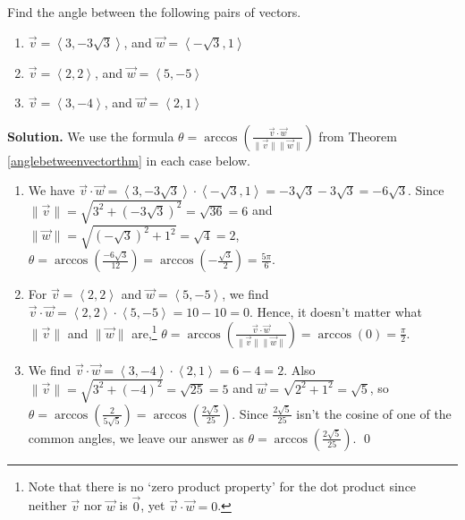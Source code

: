 \smallskip

\begin{ex} \label{anglebetweenvectorex}  Find the angle between the following pairs of vectors.

\begin{enumerate}

\item  $\vec{v} = \left< 3, -3\sqrt{3} \right>$, and $\vec{w} = \left<-\sqrt{3}, 1 \right>$

\item  $\vec{v} = \left< 2, 2 \right>$, and $\vec{w} = \left<5, -5\right>$

\item  $\vec{v} = \left< 3, -4 \right>$, and $\vec{w} = \left<2, 1\right>$

\end{enumerate}


{\bf Solution.}  We use the formula $\theta = \arccos\left( \frac{\vec{v} \cdot \vec{w}}{\| \vec{v} \| \|\vec{w} \|}\right)$ from Theorem \ref{anglebetweenvectorthm} in each case below.

\begin{enumerate}

\item  We have $\vec{v} \cdot \vec{w} = \left< 3, -3\sqrt{3} \right> \cdot \left<-\sqrt{3}, 1 \right> = -3\sqrt{3} - 3\sqrt{3} = -6\sqrt{3}$.  Since $\| \vec{v} \| = \sqrt{3^2+(-3\sqrt{3})^2} = \sqrt{36} =6$ and $\| \vec{w}\| = \sqrt{(-\sqrt{3})^2+1^2} = \sqrt{4} =2$,  $\theta = \arccos\left(\frac{-6\sqrt{3}}{12}\right) = \arccos\left(-\frac{\sqrt{3}}{2}\right) = \frac{5\pi}{6}$.

\item  For $\vec{v} = \left< 2, 2 \right>$  and $\vec{w} = \left<5, -5\right>$, we find $\vec{v} \cdot \vec{w} = \left< 2, 2 \right> \cdot \left<5, -5\right> = 10-10 = 0$.  Hence, it doesn't matter what $\| \vec{v} \|$ and $\| \vec{w} \|$ are,\footnote{Note that there is no `zero product property' for the dot product since neither $\vec{v}$ nor $\vec{w}$ is  $\vec{0}$, yet  $\vec{v} \cdot \vec{w} = 0$.} $\theta = \arccos\left( \frac{\vec{v} \cdot \vec{w}}{\| \vec{v} \| \|\vec{w} \|}\right) = \arccos(0) = \frac{\pi}{2}$.

\item  We find $\vec{v} \cdot \vec{w} = \left< 3, -4 \right> \cdot \left<2, 1\right> = 6 - 4 = 2$.  Also $\| \vec{v} \| = \sqrt{3^2+(-4)^2} = \sqrt{25} = 5$ and $\vec{w} = \sqrt{2^2+1^2} = \sqrt{5}$, so $\theta = \arccos\left(\frac{2}{5\sqrt{5}}\right) = \arccos\left(\frac{2\sqrt{5}}{25} \right)$.  Since $\frac{2\sqrt{5}}{25}$ isn't the cosine of one of the common angles, we leave our answer as $\theta = \arccos\left(\frac{2\sqrt{5}}{25} \right)$. \qed 


\end{enumerate}

\end{ex}

